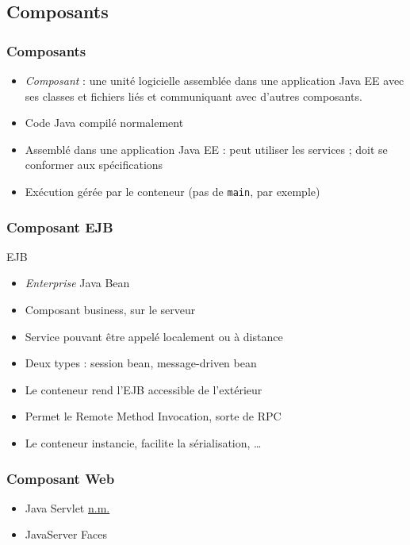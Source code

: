 \documentclass[english, french]{beamer}
\begin{document}
\subsection{Composants}
\begin{frame}
	\frametitle{Composants}
	\begin{itemize}
		\item \emph{Composant} : une unité logicielle assemblée dans une application Java EE avec ses classes et fichiers liés et communiquant avec d’autres composants.
		\item Code Java compilé normalement
		\item Assemblé dans une application Java EE : peut utiliser les services ; doit se conformer aux spécifications
		\item Exécution gérée par le conteneur (pas de \texttt{main}, par exemple)
	\end{itemize}
\end{frame}

\begin{frame}
	\frametitle{Composant EJB}
	\begin{block}{EJB}
		\begin{itemize}
			\item \emph{Enterprise} Java Bean
			\item Composant \og{}business\fg{}, sur le serveur
			\item Service pouvant être appelé localement ou à distance
			\item Deux types : session bean, message-driven bean
		\end{itemize}
	\end{block}
	\begin{itemize}
		\item Le conteneur rend l’EJB accessible de l’extérieur
		\item Permet le Remote Method Invocation, sorte de RPC
		\item Le conteneur instancie, facilite la sérialisation, …
	\end{itemize}
\end{frame}

\begin{frame}
	\frametitle{Composant Web}
	\begin{itemize}
		\item Java Servlet {\tiny \href{http://www.oqlf.gouv.qc.ca/ressources/bibliotheque/dictionnaires/internet/fiches/8386532.html}{n.m.}}
		\item JavaServer Faces
	\end{itemize}
\end{frame}
\end{document}

